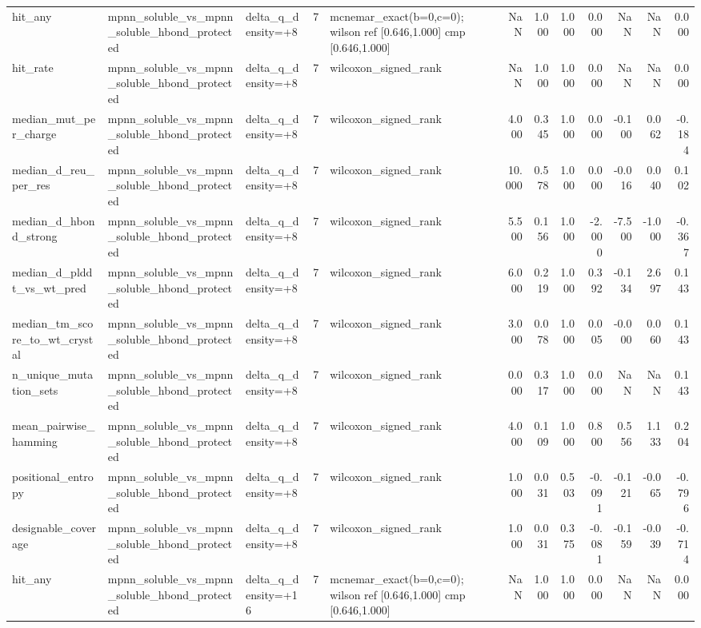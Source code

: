 \begin{table}
{\begin{tabular}{lllrlrrrrrrr}
hit\_any & mpnn\_soluble\_vs\_mpnn\_soluble\_hbond\_protected & delta\_q\_density=+8 & 7 & mcnemar\_exact(b=0,c=0); wilson ref [0.646,1.000] cmp [0.646,1.000] & NaN & 1.000 & 1.000 & 0.000 & NaN & NaN & 0.000 \\
hit\_rate & mpnn\_soluble\_vs\_mpnn\_soluble\_hbond\_protected & delta\_q\_density=+8 & 7 & wilcoxon\_signed\_rank & NaN & 1.000 & 1.000 & 0.000 & NaN & NaN & 0.000 \\
median\_mut\_per\_charge & mpnn\_soluble\_vs\_mpnn\_soluble\_hbond\_protected & delta\_q\_density=+8 & 7 & wilcoxon\_signed\_rank & 4.000 & 0.345 & 1.000 & 0.000 & -0.100 & 0.062 & -0.184 \\
median\_d\_reu\_per\_res & mpnn\_soluble\_vs\_mpnn\_soluble\_hbond\_protected & delta\_q\_density=+8 & 7 & wilcoxon\_signed\_rank & 10.000 & 0.578 & 1.000 & 0.000 & -0.016 & 0.040 & 0.102 \\
median\_d\_hbond\_strong & mpnn\_soluble\_vs\_mpnn\_soluble\_hbond\_protected & delta\_q\_density=+8 & 7 & wilcoxon\_signed\_rank & 5.500 & 0.156 & 1.000 & -2.000 & -7.500 & -1.000 & -0.367 \\
median\_d\_plddt\_vs\_wt\_pred & mpnn\_soluble\_vs\_mpnn\_soluble\_hbond\_protected & delta\_q\_density=+8 & 7 & wilcoxon\_signed\_rank & 6.000 & 0.219 & 1.000 & 0.392 & -0.134 & 2.697 & 0.143 \\
median\_tm\_score\_to\_wt\_crystal & mpnn\_soluble\_vs\_mpnn\_soluble\_hbond\_protected & delta\_q\_density=+8 & 7 & wilcoxon\_signed\_rank & 3.000 & 0.078 & 1.000 & 0.005 & -0.000 & 0.060 & 0.143 \\
n\_unique\_mutation\_sets & mpnn\_soluble\_vs\_mpnn\_soluble\_hbond\_protected & delta\_q\_density=+8 & 7 & wilcoxon\_signed\_rank & 0.000 & 0.317 & 1.000 & 0.000 & NaN & NaN & 0.143 \\
mean\_pairwise\_hamming & mpnn\_soluble\_vs\_mpnn\_soluble\_hbond\_protected & delta\_q\_density=+8 & 7 & wilcoxon\_signed\_rank & 4.000 & 0.109 & 1.000 & 0.800 & 0.556 & 1.133 & 0.204 \\
positional\_entropy & mpnn\_soluble\_vs\_mpnn\_soluble\_hbond\_protected & delta\_q\_density=+8 & 7 & wilcoxon\_signed\_rank & 1.000 & 0.031 & 0.503 & -0.091 & -0.121 & -0.065 & -0.796 \\
designable\_coverage & mpnn\_soluble\_vs\_mpnn\_soluble\_hbond\_protected & delta\_q\_density=+8 & 7 & wilcoxon\_signed\_rank & 1.000 & 0.031 & 0.375 & -0.081 & -0.159 & -0.039 & -0.714 \\
hit\_any & mpnn\_soluble\_vs\_mpnn\_soluble\_hbond\_protected & delta\_q\_density=+16 & 7 & mcnemar\_exact(b=0,c=0); wilson ref [0.646,1.000] cmp [0.646,1.000] & NaN & 1.000 & 1.000 & 0.000 & NaN & NaN & 0.000 \\

\end{tabular}}
\end{table}
